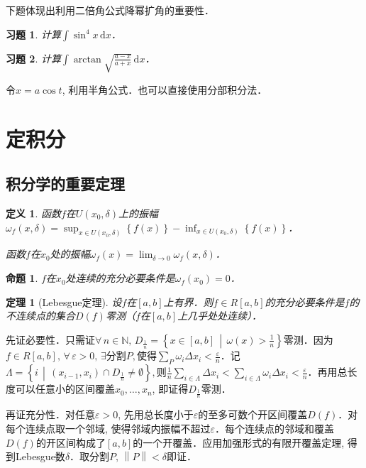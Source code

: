 \documentclass[11pt,a4paper]{ctexart}
\makeatletter
\theoremstyle{thmseries} %
\newtheorem{thm}{定理}[section]
\newtheorem{prop}{命题}[section]
\theoremstyle{exerseries}
\newtheorem{defn}{定义}[section]
\newtheorem{exer}{习题}[section]
\renewenvironment{proof}[1][\proofname]{\par
  \pushQED{\qed}%
  \normalfont \topsep6\p@\@plus6\p@\relax
  \trivlist
  \item[\hskip\labelsep
        \itshape
    #1\@addpunct{}]\ignorespaces
}{%
  \popQED\endtrivlist\@endpefalse
}
\newenvironment{sol}{\begin{proof}[\bfseries\upshape 解\quad]}{\end{proof}}
\newenvironment{pf}{\begin{proof}[\bfseries\upshape 证\quad]}{\end{proof}}
\newcommand{\cbra}[1]{\mathopen{}\left\{#1\right\}}
\renewcommand{\epsilon}{\varepsilon}
\newcommand{\N}{\mathbb{N}}
\renewcommand{\d}{\mathrm{d}}
\newcommand{\norm}[1]{\left\lVert #1 \right\rVert}
\makeatother
\begin{document}
下题体现出利用二倍角公式降幂扩角的重要性．
\begin{exer}
	计算$\int \sin^4x\,\d x$．
\end{exer}

\begin{exer}
	计算$\int\arctan\sqrt{\frac{a-x}{a+x}}\,\d x$．
\end{exer}
\begin{sol}
	令$x=a\cos t$, 利用半角公式．也可以直接使用分部积分法．
\end{sol}


\section{定积分}
\subsection{积分学的重要定理}
\begin{defn}
	函数$f$在$U(x_0,\delta)$上的振幅$\omega_f(x,\delta)=\sup_{x\in U(x_0,\delta)}\cbra{f(x)}-\inf_{x\in U(x_0,\delta)}\cbra{f(x)}$．
	
	函数$f$在$x_0$处的振幅$\omega_f(x)=\lim_{\delta\to 0}\omega_f(x,\delta)$．
\end{defn}

\begin{prop}
	$f$在$x_0$处连续的充分必要条件是$\omega_f(x_0)=0$．
\end{prop}

\begin{thm}[Lebesgue定理]
	设$f$在$[a,b]$上有界．则$f\in R[a,b]$的充分必要条件是$f$的不连续点的集合$D(f)$零测（$f$在$[a,b]$上几乎处处连续）．
\end{thm}
\begin{pf}
	先证必要性．只需证$\forall\,n\in\N,\,D_\frac{1}{n}=\cbra{x\in[a,b]\,\middle\vert\,\omega(x)>\frac{1}{n}}$零测．因为$f\in R[a,b],\,\forall\,\epsilon>0,\,\exists$分割$P,$使得$\sum_P\omega_i\Delta x_i<\frac{\epsilon}{n}$．记$\Lambda=\cbra{i\,\middle\vert\,(x_{i-1},x_i)\cap D_\frac{1}{n}\neq\emptyset},$则$\frac{1}{n}\sum_{i\in\Lambda}\Delta x_i<\sum_{i\in\Lambda}\omega_i\Delta x_i<\frac{\epsilon}{n}$．再用总长度可以任意小的区间覆盖$x_0,\dots,x_n$, 即证得$D_\frac{1}{n}$零测．

	再证充分性．对任意$\epsilon>0$, 先用总长度小于$\epsilon$的至多可数个开区间覆盖$D(f)$．对每个连续点取一个邻域, 使得邻域内振幅不超过$\epsilon$．每个连续点的邻域和覆盖$D(f)$的开区间构成了$[a,b]$的一个开覆盖．应用加强形式的有限开覆盖定理, 得到Lebesgue数$\delta$．取分割$P,\,\norm{P}<\delta$即证．
\end{pf}
\end{document}
